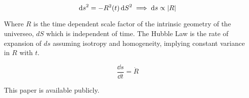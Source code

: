 \documentclass{paper}
\begin{document}
\begin{enumerate}
      \begin{equation}
        \dd{s}^2 = - {R}^2(t)\dd{S}^2 \implies \dd{s} \propto \abs{R}
      \end{equation}

      Where \(R\) is the time dependent scale factor of the intrinsic 
      geometry of the universeo, \(dS\) which is independent of time. 
      The Hubble Law is the rate of expansion of \(ds\) assuming isotropy
      and homogeneity, implying constant variance in \(R\) with \(t\).

      \[ \frac{\dd{s}}{\dd{t}} = \dot{R} \]



\end{enumerate}

This paper is available publicly.\cite{Hayden_Cosmology_Source_Repo}

\pagebreak
\printbibliography
\end{document}
